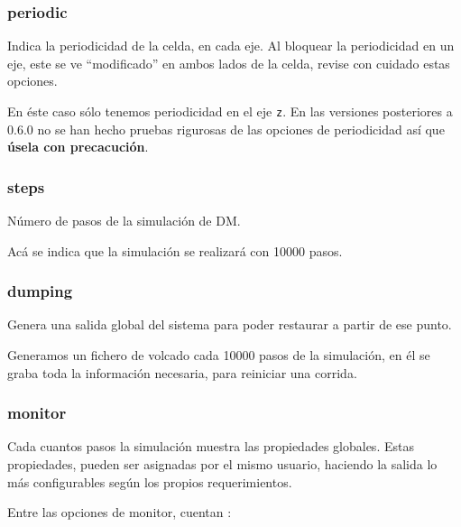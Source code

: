 \subsubsection{periodic}
Indica la periodicidad de la celda, en cada eje. Al bloquear la periodicidad en un eje, este se ve ``modificado'' en ambos lados de la celda, revise con cuidado estas opciones.


En \'este caso s\'olo tenemos periodicidad en el eje \verb|z|. En las versiones posteriores a 0.6.0 no se han hecho pruebas rigurosas de las opciones de periodicidad as\'i que \textbf{\'usela con precacuci\'on}.

\subsubsection{steps}
N\'umero de pasos de la simulaci\'on de DM.


Ac\'a se indica que la simulaci\'on se realizar\'a con 10000 pasos.

\subsubsection{dumping}
Genera una salida global del sistema para poder restaurar a partir de ese punto.


Generamos un fichero de volcado cada 10000 pasos de la simulaci\'on, en \'el se graba toda la informaci\'on necesaria, para reiniciar una corrida.

\subsubsection{monitor}
Cada cuantos pasos la simulaci\'on muestra las propiedades globales. Estas propiedades, pueden ser asignadas por el mismo usuario, haciendo la salida lo m\'as configurables seg\'un los propios requerimientos.

Entre las opciones de monitor, cuentan :


